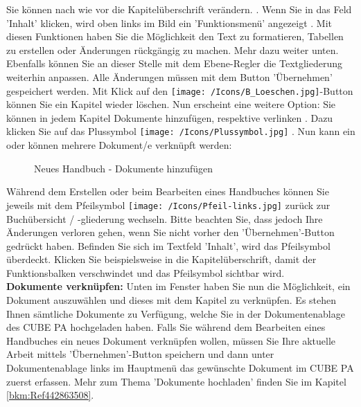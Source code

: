 Sie können nach wie vor die Kapitelüberschrift verändern. . Wenn Sie in das Feld 'Inhalt'  klicken, wird oben links im Bild ein 'Funktionsmenü' angezeigt . Mit diesen Funktionen haben Sie die Möglichkeit den Text zu formatieren, Tabellen zu erstellen oder Änderungen rückgängig zu machen. Mehr dazu weiter unten. Ebenfalls können Sie an dieser Stelle mit dem Ebene-Regler  die Textgliederung weiterhin anpassen. Alle Änderungen müssen mit dem Button 'Übernehmen'  gespeichert werden. Mit Klick auf den \texttt{[image: /Icons/B\_Loeschen.jpg]}-Button  können Sie ein Kapitel wieder löschen. Nun erscheint eine weitere Option: Sie können in jedem Kapitel Dokumente hinzufügen, respektive verlinken . Dazu klicken Sie auf das Plussymbol \texttt{[image: /Icons/Plussymbol.jpg]} . Nun kann ein oder können mehrere Dokument/e verknüpft werden:

\begin{figure}[H]
\caption{Neues Handbuch - Dokumente hinzufügen}
\end{figure}

Während dem Erstellen oder beim Bearbeiten eines Handbuches können Sie jeweils mit dem Pfeilsymbol \texttt{[image: /Icons/Pfeil-links.jpg]}  zurück zur Buchübersicht / -gliederung wechseln. Bitte beachten Sie, dass jedoch Ihre Änderungen verloren gehen, wenn Sie nicht vorher den 'Übernehmen'-Button gedrückt haben. Befinden Sie sich im Textfeld 'Inhalt', wird das Pfeilsymbol überdeckt. Klicken Sie beispielsweise in die Kapitelüberschrift, damit der Funktionsbalken verschwindet und das Pfeilsymbol sichtbar wird. \\

\textbf{Dokumente verknüpfen:} Unten im Fenster haben Sie nun die Möglichkeit, ein Dokument auszuwählen und dieses mit dem Kapitel zu verknüpfen. Es stehen Ihnen sämtliche Dokumente zu Verfügung, welche Sie in der Dokumentenablage des CUBE PA hochgeladen haben. Falls Sie während dem Bearbeiten eines Handbuches ein neues Dokument verknüpfen wollen, müssen Sie Ihre aktuelle Arbeit mittels 'Übernehmen'-Button speichern und dann unter Dokumentenablage links im Hauptmenü das gewünschte Dokument im CUBE PA zuerst erfassen. Mehr zum Thema 'Dokumente hochladen' finden Sie im Kapitel \ref{bkm:Ref442863508}. \\

